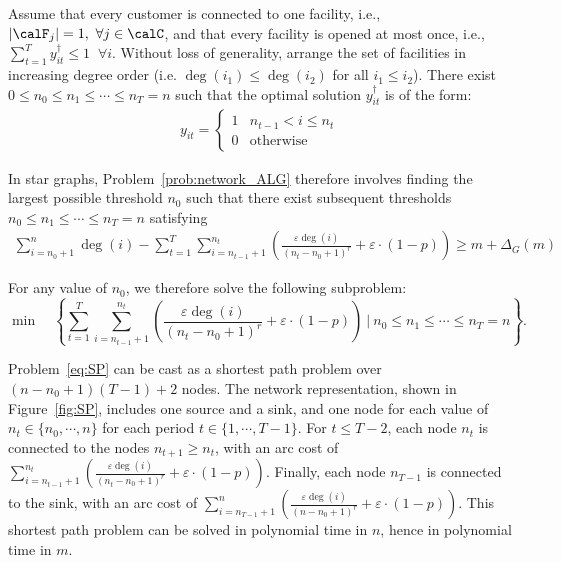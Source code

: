 \documentclass[blindrev]{informs3noheader}
\begin{document}
\begin{corollary}\label{cor:small_first}
Assume that every customer is connected to one facility, i.e., $|\calF_j|=1,\ \forall j\in\calC$, and that every facility is opened at most once, i.e., $\sum_{t=1}^T y_{it}^\dagger \leq 1 \;\;\forall i$. Without loss of generality, arrange the set of facilities in increasing degree order (i.e. $\deg(i_1)\leq \deg(i_2)$ for all $i_1\leq i_2$). There exist $0\leq n_0\leq n_1 \leq \cdots \leq n_T=n$ such that the optimal solution $y_{it}^\dagger$ is of the form:
\begin{align*}
    y_{it}=\begin{cases}
        1 & n_{t-1}<i \leq n_{t} \\
        0 & \text{otherwise}
    \end{cases}
\end{align*}
\end{corollary}

In star graphs, Problem~\eqref{prob:network_ALG} therefore involves finding the largest possible threshold $n_0$ such that there exist subsequent thresholds $n_0\leq n_1 \leq \cdots \leq n_T=n$ satisfying
\begin{align*}
\sum_{i=n_0+1}^n \deg(i)-\sum_{t=1}^T\sum_{i=n_{t-1}+1}^{n_t}\left(\frac{\varepsilon \deg(i)}{\left(n_{t}-n_0 +1\right)^r}+\varepsilon\cdot(1-p)\right)\geq m+\Delta_G(m)
\end{align*}

For any value of $n_0$, we therefore solve the following subproblem:
\begin{equation}\label{eq:SP}
\min\quad\left\{\sum_{t=1}^T\sum_{i=n_{t-1}+1}^{n_t}\left(\frac{\varepsilon\deg(i)}{\left(n_{t}-n_0 +1\right)^r}+\varepsilon\cdot(1-p)\right)\ \bigg|\ n_0\leq n_1 \leq \cdots \leq n_T=n\right\}\tag{$\calP_0^\dagger$}.
\end{equation}

Problem~\eqref{eq:SP} can be cast as a shortest path problem over $(n-n_0+1)(T-1)+2$ nodes. The network representation, shown in Figure~\ref{fig:SP}, includes one source and a sink, and one node for each value of $n_t\in\{n_0,\cdots,n\}$ for each period $t\in\{1,\cdots,T-1\}$. For $t\leq T-2$, each node $n_t$ is connected to the nodes $n_{t+1}\geq n_t$, with an arc cost of $\sum_{i=n_{t-1}+1}^{n_t}\left(\frac{\varepsilon\deg(i)}{\left(n_{t}-n_0 +1\right)^r}+\varepsilon\cdot(1-p)\right)$. Finally, each node $n_{T-1}$ is connected to the sink, with an arc cost of $\sum_{i=n_{T-1}+1}^{n}\left(\frac{\varepsilon\deg(i)}{\left(n-n_0 +1\right)^r}+\varepsilon\cdot(1-p)\right)$. This shortest path problem can be solved in polynomial time in $n$, hence in polynomial time in $m$.
\end{document}
